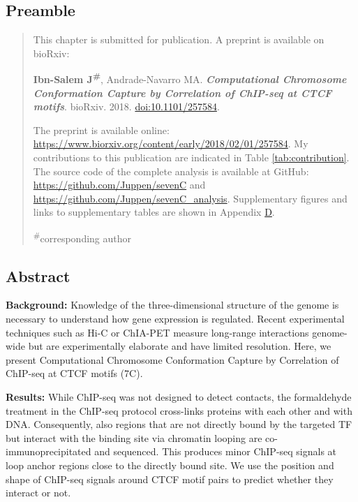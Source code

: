 \documentclass[a4paper,twoside=true,openright,parskip=full,chapterprefix=true,11pt,headings=normal,bibliography=totoc,listof=totoc,titlepage=on,captions=tableabove,draft=false]{scrreprt}
\theoremstyle{definition}
\theoremstyle{definition}
\theoremstyle{definition}
\theoremstyle{remark}
\begin{document}
\hypertarget{preamble-3}{%
\subsection*{Preamble}\label{preamble-3}}

\begin{quote}
This chapter is submitted for publication. A preprint is available on
bioRxiv:

\textbf{Ibn-Salem J\textsuperscript{\#}}, Andrade-Navarro MA.
\textbf{\emph{Computational Chromosome Conformation Capture by
Correlation of ChIP-seq at CTCF motifs}}. bioRxiv. 2018.
\href{https://doi.org/10.1101/257584}{doi:10.1101/257584}.

The preprint is available online:
\url{https://www.biorxiv.org/content/early/2018/02/01/257584}. My
contributions to this publication are indicated in Table
\ref{tab:contribution}. The source code of the complete analysis is
available at GitHub: \url{https://github.com/Juppen/sevenC} and
\url{https://github.com/Juppen/sevenC_analysis}. Supplementary figures
and links to supplementary tables are shown in Appendix
\protect\hyperlink{loop-support}{D}.

\textsuperscript{\#}corresponding author
\end{quote}

\hypertarget{abstract-4}{%
\subsection*{Abstract}\label{abstract-4}}

\textbf{Background:} Knowledge of the three-dimensional structure of the
genome is necessary to understand how gene expression is regulated.
Recent experimental techniques such as Hi-C or ChIA-PET measure
long-range interactions genome-wide but are experimentally elaborate and
have limited resolution. Here, we present Computational Chromosome
Conformation Capture by Correlation of ChIP-seq at CTCF motifs (7C).

\textbf{Results:} While ChIP-seq was not designed to detect contacts,
the formaldehyde treatment in the ChIP-seq protocol cross-links proteins
with each other and with DNA. Consequently, also regions that are not
directly bound by the targeted TF but interact with the binding site via
chromatin looping are co-immunoprecipitated and sequenced. This produces
minor ChIP-seq signals at loop anchor regions close to the directly
bound site. We use the position and shape of ChIP-seq signals around
CTCF motif pairs to predict whether they interact or not.
\end{document}
